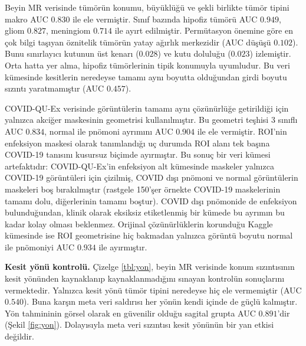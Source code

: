 Beyin MR verisinde tümörün konumu, büyüklüğü ve şekli birlikte tümör tipini makro AUC $0.830$ ile ele vermiştir. Sınıf bazında hipofiz tümörü AUC $0.949$, gliom $0.827$, meningiom $0.714$ ile ayırt edilmiştir. Permütasyon önemine göre en çok bilgi taşıyan öznitelik tümörün yatay ağırlık merkezidir (AUC düşüşü $0.102$). Bunu sınırlayıcı kutunun üst kenarı ($0.028$) ve kutu doluluğu ($0.023$) izlemiştir. Orta hatta yer alma, hipofiz tümörlerinin tipik konumuyla uyumludur. Bu veri kümesinde kesitlerin neredeyse tamamı aynı boyutta olduğundan girdi boyutu sızıntı yaratmamıştır (AUC $0.457$).

COVID-QU-Ex verisinde görüntülerin tamamı aynı çözünürlüğe getirildiği için yalnızca akciğer maskesinin geometrisi kullanılmıştır. Bu geometri teşhisi 3 sınıflı AUC $0.834$, normal ile pnömoni ayrımını AUC $0.904$ ile ele vermiştir. ROI'nin enfeksiyon maskesi olarak tanımlandığı uç durumda ROI alanı tek başına COVID-19 tanısını kusursuz biçimde ayırmıştır. Bu sonuç bir veri kümesi artefaktıdır: COVID-QU-Ex'in enfeksiyon alt kümesinde maskeler yalnızca COVID-19 görüntüleri için çizilmiş, COVID dışı pnömoni ve normal görüntülerin maskeleri boş bırakılmıştır (rastgele 150'şer örnekte COVID-19 maskelerinin tamamı dolu, diğerlerinin tamamı boştur). COVID dışı pnömonide de enfeksiyon bulunduğundan, klinik olarak eksiksiz etiketlenmiş bir kümede bu ayrımın bu kadar kolay olması beklenmez. Orijinal çözünürlüklerin korunduğu Kaggle kümesinde ise ROI geometrisine hiç bakmadan yalnızca görüntü boyutu normal ile pnömoniyi AUC $0.934$ ile ayırmıştır.

\textbf{Kesit yönü kontrolü.} Çizelge \ref{tbl:yon}, beyin MR verisinde konum sızıntısının kesit yönünden kaynaklanıp kaynaklanmadığını sınayan kontrolün sonuçlarını vermektedir. Yalnızca kesit yönü tümör tipini neredeyse hiç ele vermemiştir (AUC $0.540$). Buna karşın meta veri saldırısı her yönün kendi içinde de güçlü kalmıştır. Yön tahmininin görsel olarak en güvenilir olduğu sagital grupta AUC $0.891$'dir (Şekil \ref{fig:yon}). Dolayısıyla meta veri sızıntısı kesit yönünün bir yan etkisi değildir.

